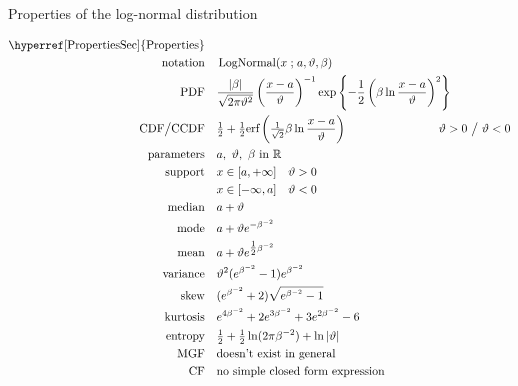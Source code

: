 

\begin{table*}[t!]
\caption[Log-normal distribution -- Properties]{Properties of the log-normal distribution}
 \begin{align*}
\text{\hyperref[PropertiesSec]{Properties}}  \quad& \\
\text{notation} \quad & \op{LogNormal}(x\given a, \vartheta,\beta ) \checked  	
\\
\text{PDF}\quad &   \frac{|\beta|}{\sqrt{2\pi \vartheta^2}} \left(\frac{x-a}{\vartheta}\right)^{-1} \exp\left\{-\frac{1}{2} \left( \beta \ln \frac{x-a}{\vartheta} \right)^2 \right\}	\checked					
\\
\text{CDF} \big/ \text{CCDF} \quad  &   \tfrac{1}{2} +  \tfrac{1}{2}\text{erf}\left( \sfrac{1}{\sqrt{2}} \beta \ln \frac{x-a}{\vartheta} \right) \checked
& \hspace{-2em} \vartheta >0 \ \big/ \ \vartheta <0
\\
\text{parameters}\quad &   a,\  \vartheta,\ \beta \text{ in } \Real		 \checked
\\
\text{support} \quad &   x \in [a, +\infty] \quad \vartheta>0 \checked
\\
& x \in [-\infty,a] \quad \vartheta<0 \checked
\\
\text{median} \quad  &  a+ \vartheta \checked
\\
\text{mode} \quad  & a+ \vartheta e^{-\beta^{-2}} \checked
\\
\text{mean} \quad  &  a + \vartheta e^{\tfrac{1}{2} \beta^{-2}} \checked
\\
\text{variance} \quad  & \vartheta^2 (e^{\beta^{-2}} -1) e^{\beta^{-2}} \checked
\\
\text{skew} \quad  &  ( e^{\beta^{-2}} +2) \sqrt{e^{\beta^{-2}} -1} \checked
\\
\text{kurtosis} \quad  &  e^{4\beta^{-2}} +2e^{3\beta^{-2}} +3e^{2\beta^{-2}} -6 \checked
\\
\text{entropy} \quad  & \tfrac{1}{2} + \tfrac{1}{2} \ln(2\pi\beta^{-2}) + \ln | \vartheta | \checked
\\
\text{MGF} \quad  &  \text{doesn't exist in general} \checked
\\
\text{CF} \quad  &  \text{no simple closed form expression} \checked
\end{align*}
\end{table*}

